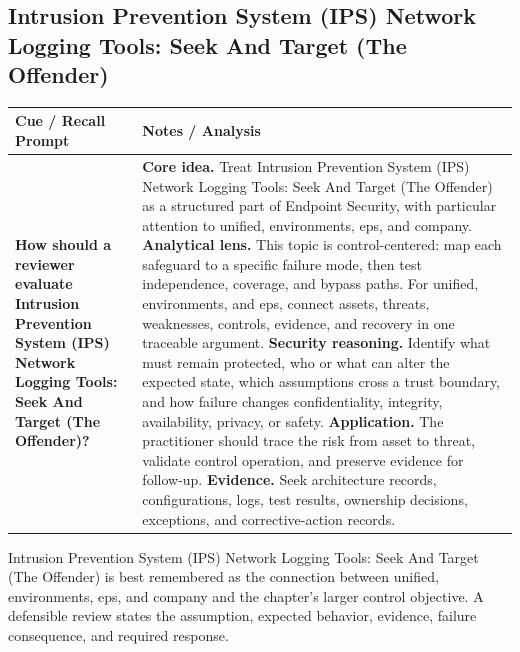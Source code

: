 \documentclass[11pt]{article}
\newcommand{\CornellHeader}{%
\rowcolor{Navy}\color{white}\bfseries Cue / Recall Prompt & \color{white}\bfseries Notes / Analysis\\\hline}
\newcommand{\CornellRow}[2]{%
\cellcolor{CueGray}\RaggedRight\textbf{#1} & \RaggedRight #2\\\hline}
\begin{document}
\subsection*{Intrusion Prevention System (IPS) Network Logging Tools: Seek And Target (The Offender)}
\begin{longtable}{>{\RaggedRight\arraybackslash}p{}|>{\RaggedRight\arraybackslash}p{}}
\CornellHeader
\CornellRow{How should a reviewer evaluate Intrusion Prevention System (IPS) Network Logging Tools: Seek And Target (The Offender)?}{\textbf{Core idea.} Treat Intrusion Prevention System (IPS) Network Logging Tools: Seek And Target (The Offender) as a structured part of Endpoint Security, with particular attention to unified, environments, eps, and company. \textbf{Analytical lens.} This topic is control-centered: map each safeguard to a specific failure mode, then test independence, coverage, and bypass paths. For unified, environments, and eps, connect assets, threats, weaknesses, controls, evidence, and recovery in one traceable argument. \textbf{Security reasoning.} Identify what must remain protected, who or what can alter the expected state, which assumptions cross a trust boundary, and how failure changes confidentiality, integrity, availability, privacy, or safety. \textbf{Application.} The practitioner should trace the risk from asset to threat, validate control operation, and preserve evidence for follow-up. \textbf{Evidence.} Seek architecture records, configurations, logs, test results, ownership decisions, exceptions, and corrective-action records.}
\end{longtable}
\begin{topicsummary}
Intrusion Prevention System (IPS) Network Logging Tools: Seek And Target (The Offender) is best remembered as the connection between unified, environments, eps, and company and the chapter's larger control objective. A defensible review states the assumption, expected behavior, evidence, failure consequence, and required response.
\end{topicsummary}
\end{document}
